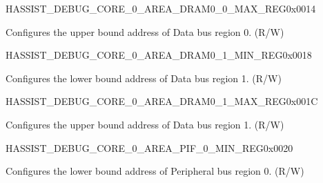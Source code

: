 \begin{register}{H}{ASSIST\_DEBUG\_CORE\_0\_AREA\_DRAM0\_0\_MAX\_REG}{0x0014}\label{regdesc:ASSISTDEBUGCORE0AREADRAM00MAXREG}
%
\regnewline%
\begin{regdesc}\begin{reglist}
\label{fielddesc:ASSISTDEBUGCORE0AREADRAM00MAX}\item [ASSIST\_DEBUG\_CORE\_0\_AREA\_DRAM0\_0\_MAX] Configures the upper bound address of Data bus region 0. (R/W)
\end{reglist}\end{regdesc}
\end{register}


\begin{register}{H}{ASSIST\_DEBUG\_CORE\_0\_AREA\_DRAM0\_1\_MIN\_REG}{0x0018}\label{regdesc:ASSISTDEBUGCORE0AREADRAM01MINREG}
%
\regnewline%
\begin{regdesc}\begin{reglist}
\label{fielddesc:ASSISTDEBUGCORE0AREADRAM01MIN}\item [ASSIST\_DEBUG\_CORE\_0\_AREA\_DRAM0\_1\_MIN] Configures the lower bound address of Data bus region 1. (R/W)
\end{reglist}\end{regdesc}
\end{register}


\begin{register}{H}{ASSIST\_DEBUG\_CORE\_0\_AREA\_DRAM0\_1\_MAX\_REG}{0x001C}\label{regdesc:ASSISTDEBUGCORE0AREADRAM01MAXREG}
%
\regnewline%
\begin{regdesc}\begin{reglist}
\label{fielddesc:ASSISTDEBUGCORE0AREADRAM01MAX}\item [ASSIST\_DEBUG\_CORE\_0\_AREA\_DRAM0\_1\_MAX] Configures the upper bound address of Data bus region 1. (R/W)
\end{reglist}\end{regdesc}
\end{register}


\begin{register}{H}{ASSIST\_DEBUG\_CORE\_0\_AREA\_PIF\_0\_MIN\_REG}{0x0020}\label{regdesc:ASSISTDEBUGCORE0AREAPIF0MINREG}
%
\regnewline%
\begin{regdesc}\begin{reglist}
\label{fielddesc:ASSISTDEBUGCORE0AREAPIF0MIN}\item [ASSIST\_DEBUG\_CORE\_0\_AREA\_PIF\_0\_MIN] Configures the lower bound address of Peripheral bus region 0. (R/W)
\end{reglist}\end{regdesc}
\end{register}


